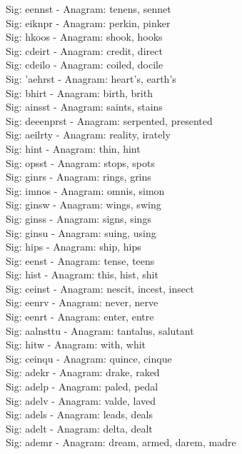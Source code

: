Sig: {eennst} - Anagram: tenens, sennet \\
Sig: {eiknpr} - Anagram: perkin, pinker \\
Sig: {hkoos} - Anagram: shook, hooks \\
Sig: {cdeirt} - Anagram: credit, direct \\
Sig: {cdeilo} - Anagram: coiled, docile \\
Sig: {'aehrst} - Anagram: heart's, earth's \\
Sig: {bhirt} - Anagram: birth, brith \\
Sig: {ainsst} - Anagram: saints, stains \\
Sig: {deeenprst} - Anagram: serpented, presented \\
Sig: {aeilrty} - Anagram: reality, irately \\
Sig: {hint} - Anagram: thin, hint \\
Sig: {opsst} - Anagram: stops, spots \\
Sig: {ginrs} - Anagram: rings, grins \\
Sig: {imnos} - Anagram: omnis, simon \\
Sig: {ginsw} - Anagram: wings, swing \\
Sig: {ginss} - Anagram: signs, sings \\
Sig: {ginsu} - Anagram: suing, using \\
Sig: {hips} - Anagram: ship, hips \\
Sig: {eenst} - Anagram: tense, teens \\
Sig: {hist} - Anagram: this, hist, shit \\
Sig: {ceinst} - Anagram: nescit, incest, insect \\
Sig: {eenrv} - Anagram: never, nerve \\
Sig: {eenrt} - Anagram: enter, entre \\
Sig: {aalnsttu} - Anagram: tantalus, salutant \\
Sig: {hitw} - Anagram: with, whit \\
Sig: {ceinqu} - Anagram: quince, cinque \\
Sig: {adekr} - Anagram: drake, raked \\
Sig: {adelp} - Anagram: paled, pedal \\
Sig: {adelv} - Anagram: valde, laved \\
Sig: {adels} - Anagram: leads, deals \\
Sig: {adelt} - Anagram: delta, dealt \\
Sig: {ademr} - Anagram: dream, armed, darem, madre \\
